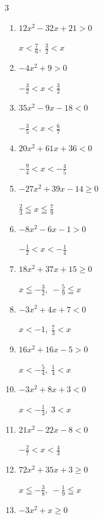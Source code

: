 \begin{multicols}{3}
\begin{enumerate}
  \item $12x^{2}-32x+21>0$

        $\displaystyle x < \frac{7}{6} , \; \frac{3}{2} < x$

  \item $-4x^{2}+9>0$

        $\displaystyle -\frac{3}{2} < x < \frac{3}{2}$

  \item $35x^{2}-9x-18<0$

        $\displaystyle -\frac{3}{5} < x < \frac{6}{7}$

\columnbreak %

  \item $20x^{2}+61x+36<0$

        $\displaystyle -\frac{9}{4} < x < -\frac{4}{5}$

  \item $-27x^{2}+39x-14\geq 0$

        $\displaystyle \frac{2}{3} \leqq x \leqq \frac{7}{9}$

  \item $-8x^{2}-6x-1>0$

        $\displaystyle -\frac{1}{2} < x < -\frac{1}{4}$

  \item $18x^{2}+37x+15\geq 0$

        $\displaystyle x \leqq -\frac{3}{2} , \; -\frac{5}{9} \leqq x$

  \item $-3x^{2}+4x+7<0$

        $\displaystyle x < -1 , \; \frac{7}{3} < x$

  \item $16x^{2}+16x-5>0$

        $\displaystyle x < -\frac{5}{4} , \; \frac{1}{4} < x$

  \item $-3x^{2}+8x+3<0$

        $\displaystyle x < -\frac{1}{3} , \; 3 < x$

  \item $21x^{2}-22x-8<0$

        $\displaystyle -\frac{2}{7} < x < \frac{4}{3}$

  \item $72x^{2}+35x+3\geq 0$

        $\displaystyle x \leqq -\frac{3}{8} , \; -\frac{1}{9} \leqq x$

  \item $-3x^{2}+x\geq 0$


\end{enumerate}
\end{multicols}
